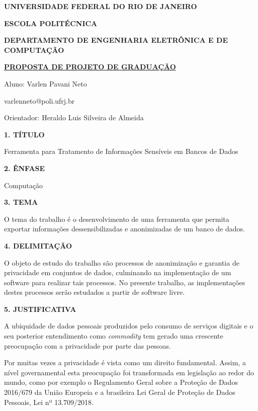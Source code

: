 \documentclass[a4paper,12pt,oneside,openany]{report}
\begin{document}
\begin{center}
\textbf{UNIVERSIDADE FEDERAL DO RIO DE JANEIRO}
\vspace{-0.2cm}

\textbf{ESCOLA POLITÉCNICA}
\vspace{-0.2cm}

\textbf{DEPARTAMENTO DE ENGENHARIA ELETRÔNICA E DE COMPUTAÇÃO}
\vspace{0.8cm}

\underline{\textbf{PROPOSTA DE PROJETO DE GRADUAÇÃO}}

Aluno: Varlen Pavani Neto
\vspace{-0.2cm}

varlenneto@poli.ufrj.br

Orientador: Heraldo Luis Silveira de Almeida
\end{center}

\textbf{1. TÍTULO}

	Ferramenta para Tratamento de Informações Sensíveis em Bancos de Dados

\vspace{0.4cm}
\textbf{2. ÊNFASE}

Computação

\vspace{0.4cm}
\textbf{3. TEMA}

O tema do trabalho é o desenvolvimento de uma ferramenta que permita exportar informações dessensibilizadas e anonimizadas de um banco de dados.

\vspace{0.4cm}
\textbf{4. DELIMITAÇÃO}

O objeto de estudo do trabalho são processos de anonimização e garantia de privacidade em conjuntos de dados,
culminando na implementação de um software para realizar tais processos. No presente trabalho, as implementações destes processos serão estudados a partir de software livre.

\vspace{0.4cm}
\textbf{5. JUSTIFICATIVA}

A ubiquidade de dados pessoais produzidos pelo consumo de serviços digitais e o seu posterior entendimento como \textit{commodity} \cite{jmeyer} tem gerado uma crescente preocupação com a privacidade por parte das pessoas. 

Por muitas vezes a privacidade é vista como um direito fundamental\cite{solove}. Assim, a nível governamental esta preocupação foi transformada em legislação ao redor do mundo, como por exemplo o Regulamento Geral sobre a Proteção de Dados 2016/679 da União Europeia e a brasileira Lei Geral de Proteção de Dados Pessoais, Lei nº 13.709/2018.
\end{document}
